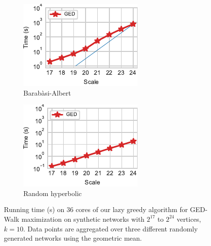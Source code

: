 \begin{figure}[tb]
\begin{subfigure}[t]{.24\textwidth}
\includegraphics[width=\textwidth]{./sources/plots/ged-walk/BA_scalability.pdf}
\caption{Barab\`asi-Albert}
\label{fig:ged-walk:BA-scalability}
\end{subfigure}\hfill
\begin{subfigure}[t]{.24\textwidth}
\includegraphics[width=\textwidth]{./sources/plots/ged-walk/RH_scalability.pdf}
\caption{Random hyperbolic}
\label{fig:ged-walk:RH-scalability}
\end{subfigure}
\caption{Running time (s) on 36 cores of our lazy greedy algorithm for GED-Walk
maximization on synthetic networks with $2^{17}$ to $2^{24}$ vertices, $k = 10$.
Data points are aggregated over three different randomly generated networks using
the geometric mean.}
\label{fig:ged-walk:synthetic-scalability}
\end{figure}

